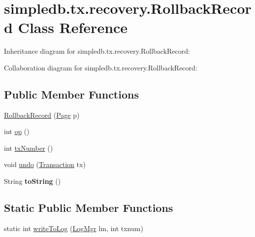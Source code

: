 \hypertarget{classsimpledb_1_1tx_1_1recovery_1_1RollbackRecord}{}\section{simpledb.\+tx.\+recovery.\+Rollback\+Record Class Reference}
\label{classsimpledb_1_1tx_1_1recovery_1_1RollbackRecord}


Inheritance diagram for simpledb.\+tx.\+recovery.\+Rollback\+Record\+:


Collaboration diagram for simpledb.\+tx.\+recovery.\+Rollback\+Record\+:
\subsection*{Public Member Functions}
\begin{DoxyCompactItemize}
\item 
\hyperlink{classsimpledb_1_1tx_1_1recovery_1_1RollbackRecord_a0e7540ad9c5f594ccfce3a1e0f38d72c}{Rollback\+Record} (\hyperlink{classsimpledb_1_1file_1_1Page}{Page} p)
\item 
int \hyperlink{classsimpledb_1_1tx_1_1recovery_1_1RollbackRecord_a4131d5dbb07f84058bd9551d023ff34b}{op} ()
\item 
int \hyperlink{classsimpledb_1_1tx_1_1recovery_1_1RollbackRecord_a89c5de69f9f9653116e3335afb4f178b}{tx\+Number} ()
\item 
void \hyperlink{classsimpledb_1_1tx_1_1recovery_1_1RollbackRecord_ad21d99845cfc0eaafe7ffdb01f8dae70}{undo} (\hyperlink{classsimpledb_1_1tx_1_1Transaction}{Transaction} tx)
\item 
\mbox{\label{classsimpledb_1_1tx_1_1recovery_1_1RollbackRecord_a91c7746dd73769aee937987306de6757}} 
String {\bfseries to\+String} ()
\end{DoxyCompactItemize}
\subsection*{Static Public Member Functions}
\begin{DoxyCompactItemize}
\item 
static int \hyperlink{classsimpledb_1_1tx_1_1recovery_1_1RollbackRecord_aa31fa6247f89d5cf47160c34d0a0dcbf}{write\+To\+Log} (\hyperlink{classsimpledb_1_1log_1_1LogMgr}{Log\+Mgr} lm, int txnum)
\end{DoxyCompactItemize}
